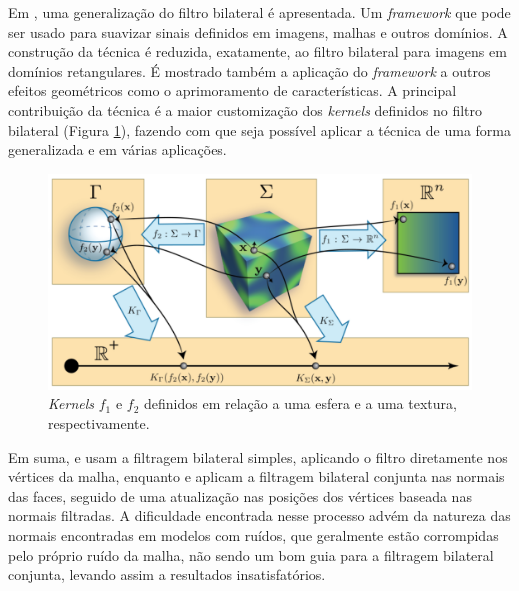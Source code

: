 Em \cite{solomon2014general}, uma generalização do filtro bilateral é apresentada. Um \textit{framework} que pode ser usado para suavizar sinais definidos em imagens, malhas e outros domínios. A construção da técnica é reduzida, exatamente, ao filtro bilateral para imagens em domínios retangulares. É mostrado também a aplicação do \textit{framework} a outros efeitos geométricos como o aprimoramento de características. A principal contribuição da técnica é a maior customização dos \textit{kernels} definidos no filtro bilateral (Figura \ref{fig:kernelframework}), fazendo com que seja possível aplicar a técnica de uma forma generalizada e em várias aplicações.

\begin{figure}[!h]
\captionsetup{width=\linewidth}
\centering
\includegraphics[scale=0.3]{figuras/kernelframework.png}
\caption{\textit{Kernels} $f_1$ e $f_2$ definidos em relação a uma esfera e a uma textura, respectivamente.}
\label{fig:kernelframework}
\end{figure}

Em suma, \cite{fleishman2003bilateral} e \cite{jones2003non} usam a filtragem bilateral simples, aplicando o filtro diretamente nos vértices da malha, enquanto \cite{zheng2011bilateral} e \cite{solomon2014general} aplicam a filtragem bilateral conjunta nas normais das faces, seguido de uma atualização nas posições dos vértices baseada nas normais filtradas. A dificuldade encontrada nesse processo advém da natureza das normais encontradas em modelos com ruídos, que geralmente estão corrompidas pelo próprio ruído da malha, não sendo um bom guia para a filtragem bilateral conjunta, levando assim a resultados insatisfatórios.

